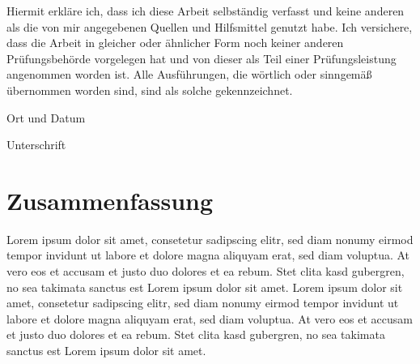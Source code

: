 \pagestyle{plain}
\hphantom{ }
\vfill
{}\par\vspace{2mm}
\par\vspace{1cm}
\noindent Hiermit erkläre ich, dass ich diese Arbeit selbständig verfasst und keine anderen als die von mir angegebenen Quellen und Hilfsmittel genutzt habe. Ich versichere, dass die Arbeit in gleicher oder ähnlicher Form noch keiner anderen Prüfungsbehörde vorgelegen hat und von dieser als Teil einer Prüfungsleistung angenommen worden ist. Alle Ausführungen, die wörtlich oder sinngemäß übernommen worden sind, sind als solche gekennzeichnet.

\vspace{2cm}
\noindent\begin{minipage}{.4\linewidth}
\centering
\hrulefill\par 
Ort und Datum
\end{minipage}\hfill
\begin{minipage}{.4\linewidth}
\centering
\hrulefill\par 
Unterschrift
\end{minipage}
\cleardoublepage

\chapter*{Zusammenfassung}

Lorem ipsum dolor sit amet, consetetur sadipscing elitr, sed diam nonumy eirmod tempor invidunt ut labore et dolore magna aliquyam erat, sed diam voluptua. At vero eos et accusam et justo duo dolores et ea rebum. Stet clita kasd gubergren, no sea takimata sanctus est Lorem ipsum dolor sit amet. Lorem ipsum dolor sit amet, consetetur sadipscing elitr, sed diam nonumy eirmod tempor invidunt ut labore et dolore magna aliquyam erat, sed diam voluptua. At vero eos et accusam et justo duo dolores et ea rebum. Stet clita kasd gubergren, no sea takimata sanctus est Lorem ipsum dolor sit amet.


\pagestyle{running}
\renewcommand{\contentsname}{Table of Contents}
\tableofcontents

\listoffigures
